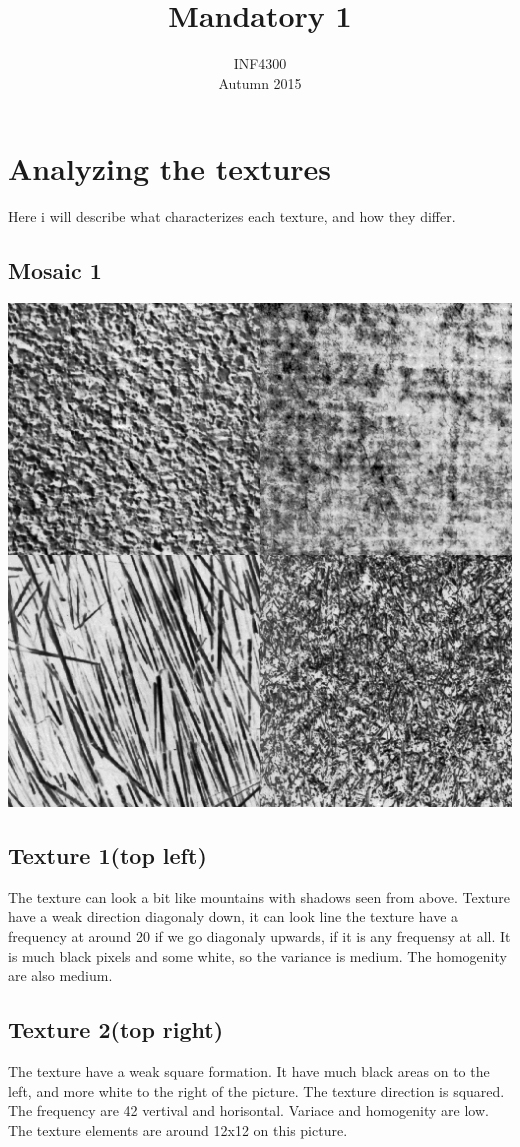 \documentclass{article}
\title{Mandatory 1}
\author{INF4300 \\ Autumn 2015}
\begin{document}
\maketitle{}
\break
\section{Analyzing the textures}

Here i will describe what characterizes each texture, and how they differ.  
\subsection{Mosaic 1}
\includegraphics[totalheight=12cm]{mosaic1.png}
\subsection{Texture 1(top left)}
The texture can look a bit like mountains with shadows seen from above.
Texture have a weak direction diagonaly down, it can look line the texture have a frequency at around 20 if we go diagonaly upwards, if it is any frequensy at all. It is much black pixels and some white, so the variance is medium. The homogenity are also medium.
\subsection{Texture 2(top right)}
The texture have a weak square formation. It have much black areas on to the left, and more white to the right of the picture. The texture direction is squared. The frequency are 42 vertival and horisontal. Variace and homogenity are low. The texture elements are around 12x12 on this picture.   
\end{document}
